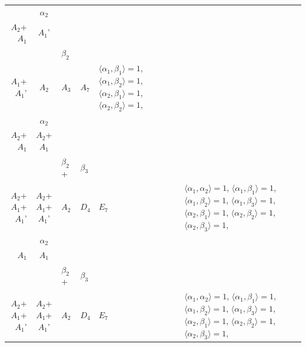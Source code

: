 \documentclass[12pt]{report}
\begin{document}
\begin{appendix}
{\begin{longtable}{rcl p{1cm}p{1cm}p{3cm} }
\\
\begin{tabular}{cc}$\alpha_1$+ & $\alpha_2$\\\tiny{ $A_2$+$A_1$ } & \tiny{ $A_1$' }\end{tabular} &\begin{tabular}{c} = \\~ \end{tabular} & \begin{tabular}{cc}$\beta_1$+ & $\beta_2$\\\tiny{ $A_1$+$A_1$' } & \tiny{ $A_2$ }\end{tabular} & $A_3$ & $A_7$ &  $\langle\alpha_1, \beta_1\rangle=1$, $\langle\alpha_1, \beta_2\rangle=1$, $\langle\alpha_2, \beta_1\rangle=1$, $\langle\alpha_2, \beta_2\rangle=1$, 
\\
\begin{tabular}{cc}$\alpha_1$+ & $\alpha_2$\\\tiny{ $A_2$+$A_1$ } & \tiny{ $A_2$+$A_1$ }\end{tabular} &\begin{tabular}{c} = \\~ \end{tabular} & \begin{tabular}{ccc}$\beta_1$+ & $\beta_2$+ & $\beta_3$\\\tiny{ $A_2$+$A_1$+$A_1$' } & \tiny{ $A_2$+$A_1$+$A_1$' } & \tiny{ $A_2$ }\end{tabular} & $D_4$ & $E_7$ & $\langle\alpha_1, \alpha_2\rangle=1$,  $\langle\alpha_1, \beta_1\rangle=1$, $\langle\alpha_1, \beta_2\rangle=1$, $\langle\alpha_1, \beta_3\rangle=1$, $\langle\alpha_2, \beta_1\rangle=1$, $\langle\alpha_2, \beta_2\rangle=1$, $\langle\alpha_2, \beta_3\rangle=1$, 
\\
\begin{tabular}{cc}$\alpha_1$+ & $\alpha_2$\\\tiny{ $A_1$ } & \tiny{ $A_1$ }\end{tabular} &\begin{tabular}{c} = \\~ \end{tabular} & \begin{tabular}{ccc}$\beta_1$+ & $\beta_2$+ & $\beta_3$\\\tiny{ $A_2$+$A_1$+$A_1$' } & \tiny{ $A_2$+$A_1$+$A_1$' } & \tiny{ $A_2$ }\end{tabular} & $D_4$ & $E_7$ & $\langle\alpha_1, \alpha_2\rangle=1$,  $\langle\alpha_1, \beta_1\rangle=1$, $\langle\alpha_1, \beta_2\rangle=1$, $\langle\alpha_1, \beta_3\rangle=1$, $\langle\alpha_2, \beta_1\rangle=1$, $\langle\alpha_2, \beta_2\rangle=1$, $\langle\alpha_2, \beta_3\rangle=1$, 

\end{longtable}}
\end{appendix}
\end{document}
